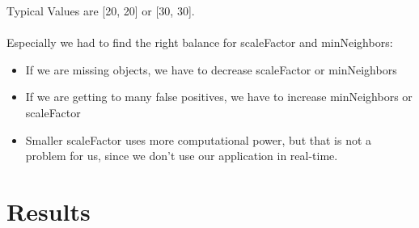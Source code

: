 \documentclass[11pt, a4paper, twocolumn]{article}
\begin{document}
Typical Values are [20, 20] or [30, 30].\\\\
Especially we had to find the right balance for scaleFactor and minNeighbors:
\begin{itemize}
    \item If we are missing objects, we have to decrease scaleFactor or minNeighbors
    \item If we are getting to many false positives, we have to increase minNeighbors or scaleFactor
    \item Smaller scaleFactor uses more computational power, but that is not a problem for us, since we don’t use our application in real-time.
\end{itemize}
%


\section*{Results}
\end{document}
